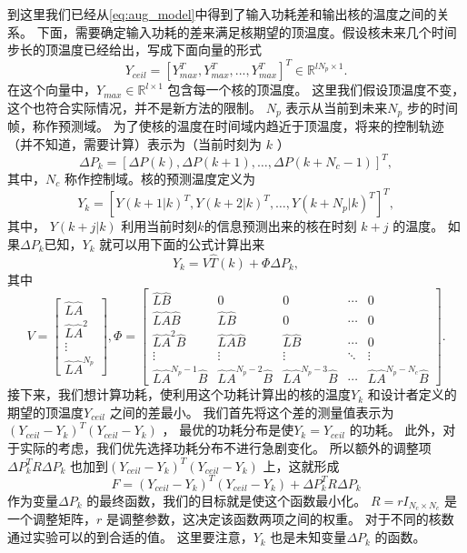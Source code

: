 到这里我们已经从\eqref{eq:aug_model}中得到了输入功耗差和输出核的温度之间的关系。
下面，需要确定输入功耗的差来满足核期望的顶温度。假设核未来几个时间步长的顶温度已经给出，写成下面向量的形式
\begin{equation*}
Y_{ceil} = [Y_{max}^T, Y_{max}^T, ..., Y_{max}^T]^T \in \mathbb{R}^{lN_p \times 1}.
\end{equation*}
在这个向量中，$Y_{max} \in \mathbb{R}^{l \times 1}$ 包含每一个核的顶温度。
这里我们假设顶温度不变，这个也符合实际情况，并不是新方法的限制。
$N_p$ 表示从当前到未来$N_p$ 步的时间帧，称作预测域。
为了使核的温度在时间域内趋近于顶温度，将来的控制轨迹（并不知道，需要计算）表示为（当前时刻为 $k$ ）
\begin{equation*}
\Delta P_k = [\Delta P(k), \Delta P(k+1), \ldots, \Delta P(k+N_c-1)]^T,
\end{equation*}
其中，$N_c$ 称作控制域。核的预测温度定义为
\begin{equation*}
Y_k = [Y(k+1|k)^T, Y(k+2|k)^T, \ldots, Y(k+N_p|k)^T]^T,
\end{equation*}
其中， $Y(k+j|k)$ 利用当前时刻$k$的信息预测出来的核在时刻 $k+j$ 的温度。
如果$\Delta P_k$已知，$Y_k$ 就可以用下面的公式计算出来
\begin{equation}\label{eq:pred_eq}
Y_k = V\hat{T}(k) + \Phi \Delta P_k,
\end{equation}
其中 
\begin{equation*}
V = 
\left[
\begin{array}{c}
\hat{L}\hat{A}\\
\hat{L}\hat{A}^2\\
\vdots\\
\hat{L}\hat{A}^{N_p}
\end{array}
\right],
\Phi = 
\left[
\begin{array}{ccccc}
\hat{L} \hat{B} & 0  & 0 & \cdots & 0\\
\hat{L} \hat{A} \hat{B} & \hat{L} \hat{B} & 0 & \cdots & 0 \\
\hat{L} \hat{A}^2 \hat{B} & \hat{L} \hat{A} \hat{B} & \hat{L} \hat{B} & \cdots & 0\\
\vdots &  \vdots & \vdots & \ddots & \vdots \\
\hat{L} \hat{A}^{N_p-1} \hat{B} & \hat{L} \hat{A}^{N_p-2} \hat{B} &
\hat{L} \hat{A}^{N_p-3} \hat{B} & \cdots & \hat{L} \hat{A}^{N_p-N_c} \hat{B}
\end{array}
\right].
\end{equation*}
接下来，我们想计算功耗，使利用这个功耗计算出的核的温度$Y_k$  和设计者定义的期望的顶温度$Y_{ceil}$ 之间的差最小。
我们首先将这个差的测量值表示为$(Y_{ceil}-Y_k)^T(Y_{ceil}-Y_k)$ ， 最优的功耗分布是使$Y_k=Y_{ceil}$ 的功耗。
此外，对于实际的考虑，我们优先选择功耗分布不进行急剧变化。
所以额外的调整项 $\Delta P_k^TR\Delta P_k$ 也加到$(Y_{ceil}-Y_k)^T(Y_{ceil}-Y_k)$ 上，这就形成
\begin{equation}\label{eq:cost_fun}
F = (Y_{ceil}-Y_k)^T(Y_{ceil}-Y_k)+\Delta P_k^TR\Delta P_k
\end{equation}
作为变量$\Delta P_k$ 的最终函数，我们的目标就是使这个函数最小化。
$R=rI_{N_c \times N_c}$ 是一个调整矩阵，$r$ 是调整参数，这决定该函数两项之间的权重。
对于不同的核数通过实验可以的到合适的值。
这里要注意，$Y_k$ 也是未知变量$\Delta P_k$ 的函数。

